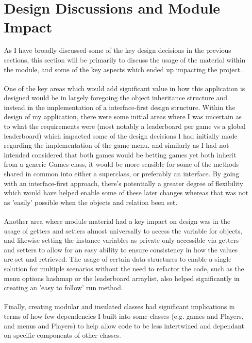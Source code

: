 \documentclass{scrreprt}
\begin{document}
\section{Design Discussions and Module Impact}\label{Classes}
As I have broadly discussed some of the key design decisions in the previous sections, this section will be primarily to discuss the usage of the material within the module, and some of the key aspects which ended up impacting the project.\\
\\
One of the key areas which would add significant value in how this application is designed would be in largely foregoing the object inheritance structure and instead in the implementation of a interface-first design structure. Within the design of my application, there were some initial areas where I was uncertain as to what the requirements were (most notably a leaderboard per game vs a global leaderboard) which impacted some of the design decisions I had initially made regarding the implementation of the game menu, and similarly as I had not intended considered that both games would be betting games yet both inherit from a generic Games class, it would be more sensible for some of the methods shared in common into either a superclass, or preferably an interface. By going with an interface-first approach, there's potentially a greater degree of flexibility which would have helped enable some of these later changes whereas that was not as 'easily' possible when the objects and relation been set.\\
\\
Another area where module material had a key impact on design was in the usage of getters and setters almost universally to access the variable for objects, and likewise setting the instance variables as private only accessible via getters and setters to allow for an easy ability to ensure consistency in how the values are set and retrieved. The usage of certain data structures to enable a single solution for multiple scenarios without the need to refactor the code, such as the menu options hashmap or the leaderboard arraylist, also helped significantly in creating an 'easy to follow' run method.\\
\\
Finally, creating modular and insulated classes had significant implications in terms of how few dependencies I built into some classes (e.g. games and Players, and menus and Players) to help allow code to be less intertwined and dependant on specific components of other classes.
\end{document}
